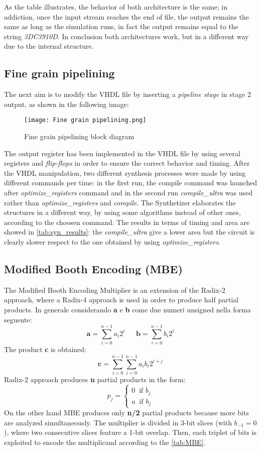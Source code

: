 As the table illustrates, the behavior of both architecture is the same; in addiction, once the input stream reaches the end of file, the output remains the same as long as the simulation runs, in fact the output remains equal to the string \textit{3DC3910D}. In conclusion both architectures work, but in a different way due to the internal structure.


\subsection{Fine grain pipelining}
The next aim is to modify the VHDL file by inserting a \textit{pipeline stage} in stage 2 output, as shown in the following image:
\begin{figure}[H]
	\center
	\texttt{[image: Fine grain pipelining.png]}
	\caption{Fine grain pipelining block diagram}
	\label{fig:mult_struct}
\end{figure}
The output register has been implemented in the VHDL file by using several registers and \textit{flip-flops} in order to ensure the correct behavior and timing.  After the VHDL manipulation, two different synthesis processes were made by using different commands per time: in the first run, the compile command was launched after \textit{optimize\_registers} command and in the second run  \textit{compile\_ultra} was used rather than \textit{optimize\_registers} and \textit{compile}. The Synthetizer elaborates the structures in a different way, by using some algorithms instead of other ones, according to the choosen command. The results in terms of timing and area are showed in \autoref{tab:syn_results}: the \textit{compile\_ultra} give a lower area but the circuit is clearly slower respect to the one obtained by using \textit{optimize\_registers}.


\subsection{Modified Booth Encoding (MBE)}
The Modified Booth Encoding Multiplier is an extension of the Radix-2 approach, where a Radix-4 approach is used in order to produce half partial products. In generale considerando \textbf{a} e \textbf{b} come due numeri unsigned nella forma seguente:
$$
\textbf{a} = \sum_{i=0}^{n-1}a_i2^i\ \ \ \ \ \ \  \textbf{b} = \sum_{i=0}^{n-1}b_i2^i
$$
The product \textbf{c} is obtained:
$$
\textbf{c} = \sum_{i=0}^{n-1}\sum_{i=0}^{n-1}a_ib_i2^{i+j}
$$
Radix-2 approach produces \textbf{n} partial products in the form:
$$
p_j = 
\begin{cases}
0 \ \textrm{  if   } \overline{b}_j\\
a \ \textrm{  if   } {b}_j
\end{cases}
$$
On the other hand MBE produces only \textbf{n/2} partial products because more bits are analyzed simultaneously. The multiplier is divided in 3-bit slices (with $b_{-1} = 0$), where two consecutive slices feature a 1-bit overlap. Then, each triplet of bits is exploited to encode the multiplicand according to the \autoref{tab:MBE}.

